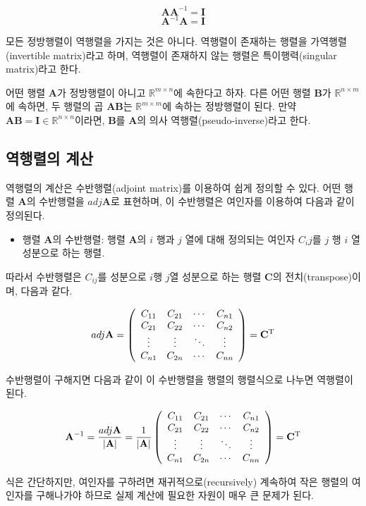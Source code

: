 $$\mathbf {AA}^{-1} = \mathbf I$$
$$\mathbf A^{-1} \mathbf A = \mathbf I$$

모든 정방행렬이 역행렬을 가지는 것은 아니다. 역행렬이 존재하는 행렬을 가역행렬(invertible matrix)라고 하며,
역행렬이 존재하지 않는 행렬은 특이행력(singular matrix)라고 한다.

어떤 행렬 $\mathbf A$가 정방행렬이 아니고 $\mathbb R^{m \times n}$에 속한다고 하자.
다른 어떤 행렬 $\mathbf B$가 $\mathbb R^{n \times m}$에 속하면, 두 행렬의 곱 $\mathbf {AB}$는 $\mathbb R^{m \times m}$에 속하는 정방행렬이
된다. 만약 $\mathbf {AB} = \mathbf I \in \mathbb R^{n \times n}$이라면,
$\mathbf B$를 $\mathbf A$의 의사 역행렬(pseudo-inverse)라고 한다.

\subsection{역행렬의 계산}

역행렬의 계산은 수반행렬(adjoint matrix)를 이용하여 쉽게 정의할 수 있다.
어떤 행렬 $\mathbf A$의 수반행렬을 $adj \mathbf A$로 표현하며, 이 수반행렬은 여인자를 이용하여 다음과 같이 정의된다.

\begin{itemize}
\item 행렬 $\mathbf A$의 수반행렬: 행렬 $\mathbf A$의 $i$ 행과 $j$ 열에 대해 정의되는 여인자 $C_ij$를 $j$ 행 $i$ 열 성분으로 하는 행렬.
\end{itemize}

따라서 수반행렬은 $C_{ij}$를 성분으로 $i$행 $j$열 성분으로 하는 행렬 $\mathbf C$의 전치(transpose)이며, 다음과 같다. 

\begin{eqnarray}
adj \mathbf A = 
\left (
\begin{array}{cccc}
C_{11} & C_{21} & \cdots & C_{n1} \\
C_{21} & C_{22} & \cdots & C_{n2} \\
\vdots & \vdots & \ddots & \vdots \\
C_{n1} & C_{2n} & \cdots & C_{nn} \\
\end{array}
\right )
= \mathbf C^{\rm T}
\end{eqnarray}
 
수반행렬이 구해지면 다음과 같이 이 수반행렬을 행렬의 행렬식으로 나누면 역행렬이 된다.

\begin{eqnarray}
\mathbf A^{-1} = \frac{adj \mathbf A}{|\mathbf A|} = 
\frac{1}{|\mathbf A|}
\left (
\begin{array}{cccc}
C_{11} & C_{21} & \cdots & C_{n1} \\
C_{21} & C_{22} & \cdots & C_{n2} \\
\vdots & \vdots & \ddots & \vdots \\
C_{n1} & C_{2n} & \cdots & C_{nn} \\
\end{array}
\right )
= \mathbf C^{\rm T}
\end{eqnarray}

식은 간단하지만, 여인자를 구하려면 재귀적으로(recursively) 계속하여 작은 행렬의 여인자를 구해나가야 하므로 실제 계산에 필요한 자원이 매우 큰 문제가 된다.
